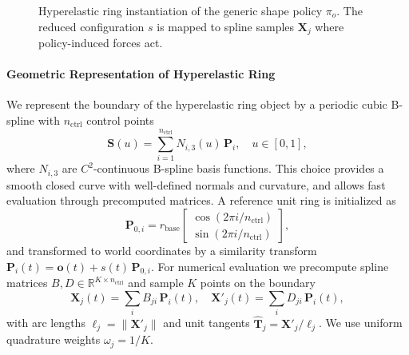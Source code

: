 \begin{figure}[htbp]
\centering
{}
\caption{Hyperelastic ring instantiation of the generic shape policy $\pi_o$.
The reduced configuration $s$ is mapped to spline samples $\mathbf{X}_j$ where policy-induced forces act.}
\label{fig:hyperelastic_ring}
\end{figure}

\paragraph{Geometric Representation of Hyperelastic Ring}

We represent the boundary of the hyperelastic ring object by a periodic cubic B-spline with $n_{\text{ctrl}}$ control points
\begin{equation}
\mathbf{S}(u) = \sum_{i=1}^{n_{\text{ctrl}}} N_{i,3}(u)\,\mathbf{P}_i,
\quad u \in [0,1],
\end{equation}
where $N_{i,3}$ are $C^2$-continuous B-spline basis functions.
This choice provides a smooth closed curve with well-defined normals and curvature, and allows fast evaluation through precomputed matrices. A reference unit ring is initialized as
\begin{equation}
\mathbf{P}_{0,i} 
= r_{\text{base}}
\begin{bmatrix}
\cos(2\pi i/n_{\text{ctrl}}) \\
\sin(2\pi i/n_{\text{ctrl}})
\end{bmatrix},
\end{equation}
and transformed to world coordinates by a similarity transform
\(\mathbf{P}_i(t) = \mathbf{o}(t) + s(t)\,\mathbf{P}_{0,i}.\)
For numerical evaluation we precompute spline matrices $B,D\in\mathbb{R}^{K\times n_{\text{ctrl}}}$ and sample $K$ points on the boundary
\begin{equation}
\mathbf{X}_j(t) = \sum_{i} B_{ji}\,\mathbf{P}_i(t), 
\quad
\mathbf{X}'_j(t) = \sum_{i} D_{ji}\,\mathbf{P}_i(t),
\end{equation}
with arc lengths $\ell_j = \|\mathbf{X}'_j\|$ and unit tangents $\hat{\mathbf{T}}_j = \mathbf{X}'_j / \ell_j$.
We use uniform quadrature weights $\omega_j= 1/K$.


